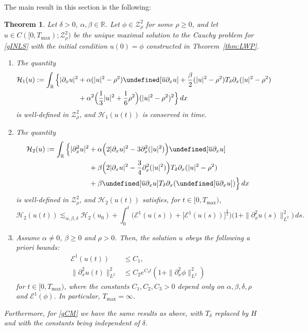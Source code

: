 \documentclass{amsart}
\newtheorem{theorem}{Theorem}[section]
\numberwithin{equation}{section}
\newcommand{\Td}{T_{\delta}}
\let\Im=\undefined\DeclareMathOperator{\Im}{Im}
\begin{document}
\medskip
The main result in this section is the following:
\begin{theorem}\label{thm:conservation}
Let $\delta>0$, $\alpha,\beta \in \mathbb{R}$.
Let $\phi\in \mathcal{Z}^2_\rho$ for some $\rho\geq 0$, and let $u\in C([0,T_{\max});\mathcal{Z}^2_\rho)$ be the unique maximal solution to the Cauchy problem for \eqref{gINLS} with the initial condition $u(0)=\phi$ constructed in Theorem~\ref{thm:LWP}.
\begin{enumerate} 
\item[$\mathrm{(i)}$] The quantity 
\begin{equation*}
\begin{aligned}
\mathcal{H}_1(u):=\int_{\mathbb{R}} \Big\{ |\partial_{x}u|^2&+\alpha (|u|^2-\rho^2)\Im[ \overline{u}\partial_{x}u] +\frac{\beta}{2} (|u|^2-\rho^2)\Td \partial_{x}(|u|^2-\rho^2) \\
&+\alpha^2\Big(\frac{1}{3}|u|^2+\frac{1}{6}\rho^2\Big) (|u|^2-\rho^2)^2\Big\} \,dx 
\end{aligned}
\end{equation*}
is well-defined in $\mathcal{Z}^2_\rho$, and $\mathcal{H}_1(u(t))$ is conserved in time.

\item[$\mathrm{(ii)}$] The quantity
\begin{equation*}
\begin{aligned}
\mathcal{H}_2(u):=\int_{\mathbb{R}} \Big\{ |\partial_x^2u|^2 &+\alpha \Big( 2|\partial_xu|^2-3\partial_x^2(|u|^2)\Big) \Im[\overline{u}\partial_xu]  \\
&+\beta \Big( 2|\partial_xu|^2-\frac34\partial_x^2(|u|^2)\Big) \Td\partial_x(|u|^2-\rho^2) \\
&+\beta \Im[\overline{u}\partial_xu]\Td\partial_x(\Im[\overline{u}\partial_xu]) \Big\} \,dx 
\end{aligned}
\end{equation*}
is well-defined in $\mathcal{Z}^2_\rho$, and $\mathcal{H}_2(u(t))$ satisfies, for $t\in [0,T_{\max})$,
\begin{equation}\label{est:I2}
\mathcal{H}_2(u(t))\lesssim_{\alpha, \beta,\delta} \mathcal{H}_2(u_0)+\int_0^t\Big( \mathcal{E}^1(u(s))+\big[ \mathcal{E}^1(u(s))\big]^{\frac32}\Big) \Big( 1+\| \partial_x^2u(s)\|_{L^2}^2\Big)\,ds.
\end{equation}

\item[$\mathrm{(iii)}$] Assume $\alpha \neq 0$, $\beta \geq 0$ and $\rho>0$. 
Then, the solution $u$ obeys the following a priori bounds:
\begin{align}
\mathcal{E}^1(u(t))&\leq C_1, \label{apriori:e1} \\
\| \partial_x^2u(t)\|_{L^2}^2&\leq C_2e^{C_3t}(1+\|\partial_x^2\phi\|_{L^2}^2) \label{apriori:p2}
\end{align}
for $t\in [0,T_{\max})$, where the constants $C_1,C_2,C_3>0$ depend only on $\alpha,\beta,\delta,\rho$ and $\mathcal{E}^1(\phi)$.
In particular, $T_{\max}=\infty$.
\end{enumerate} 
Furthermore, for \eqref{gCM} we have the same results as above, with $\Td$ replaced by $H$ and with the constants being independent of $\delta$.
\end{theorem}
\end{document}
